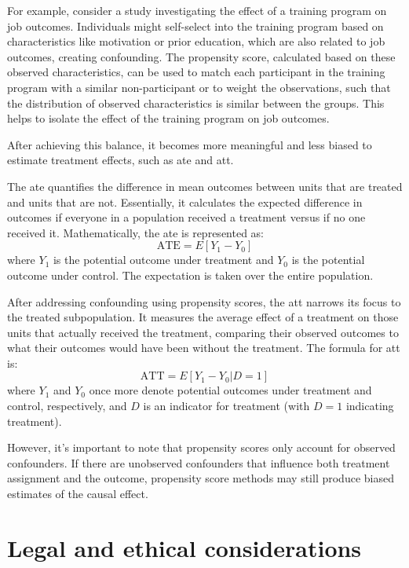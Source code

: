 \begin{enumerate}
    For example, consider a study investigating the effect of a training program on job outcomes. Individuals might self-select into the training program based on characteristics like motivation or prior education, which are also related to job outcomes, creating confounding. The propensity score, calculated based on these observed characteristics, can be used to match each participant in the training program with a similar non-participant or to weight the observations, such that the distribution of observed characteristics is similar between the groups. This helps to isolate the effect of the training program on job outcomes.
    

    After achieving this balance, it becomes more meaningful and less biased to estimate treatment effects, such as \ac{ate} and \ac{att}.

The \ac{ate} quantifies the difference in mean outcomes between units that are treated and units that are not. Essentially, it calculates the expected difference in outcomes if everyone in a population received a treatment versus if no one received it. Mathematically, the \ac{ate} is represented as:
\[ \text{ATE} = E[Y_1 - Y_0] \]
where \( Y_1 \) is the potential outcome under treatment and \( Y_0 \) is the potential outcome under control. The expectation is taken over the entire population.

After addressing confounding using propensity scores, the \ac{att} narrows its focus to the treated subpopulation. It measures the average effect of a treatment on those units that actually received the treatment, comparing their observed outcomes to what their outcomes would have been without the treatment. The formula for \ac{att} is:
\[ \text{ATT} = E[Y_1 - Y_0 | D = 1] \]
where \( Y_1 \) and \( Y_0 \) once more denote potential outcomes under treatment and control, respectively, and \( D \) is an indicator for treatment (with \( D = 1 \) indicating treatment).


    However, it's important to note that propensity scores only account for observed confounders. If there are unobserved confounders that influence both treatment assignment and the outcome, propensity score methods may still produce biased estimates of the causal effect.

\end{enumerate}


\section{Legal and ethical considerations}

